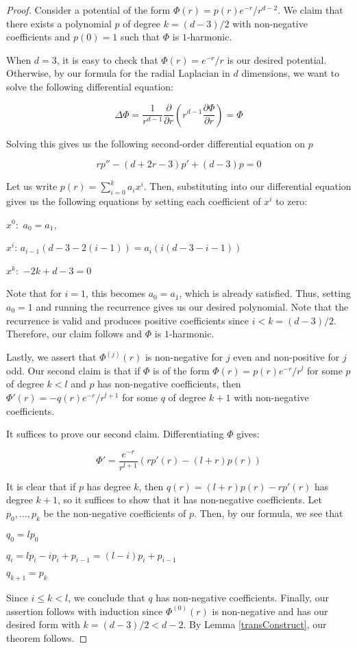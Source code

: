 \begin{proof}
Consider a potential of the form $\Phi(r) = p(r)e^{-r}/r^{d-2}$. We claim that there exists a polynomial $p$ of degree $k = (d-3)/2$ with non-negative coefficients and $p(0) = 1$ such that $\Phi$ is $1$-harmonic.

When $d = 3$, it is easy to check that $\Phi(r) = e^{-r}/r$ is our desired potential. Otherwise, by our formula for the radial Laplacian in $d$ dimensions, we want to solve the following differential equation:

\[\Delta \Phi =  \frac{1}{r^{d-1}} \frac{\partial}{\partial r} (r^{d-1} \frac{\partial \Phi}{\partial r}) = \Phi\]

Solving this gives us the following second-order differential equation on $p$

\[rp'' - (d+2r-3)p' +(d-3)p = 0\]

Let us write $p(r) = \sum_{i=0}^k a_i x^i$. Then, substituting into our differential equation gives us the following equations by setting each coefficient of $x^i$ to zero:

$x^0:$ $a_0 = a_1$,

$x^i$:  $a_{i-1}(d-3 - 2(i-1)) = a_i (i(d-3 - i-1))$

$x^k:$ $-2k +d-3 = 0$

Note that for $i = 1$, this becomes $a_0 = a_1$, which is already satisfied. Thus, setting $a_0 = 1$ and running the recurrence gives us our desired polynomial. Note that the recurrence is valid and produces positive coefficients since $i < k  = (d-3)/2$. Therefore, our claim follows and $\Phi$ is $1$-harmonic.

Lastly, we assert that $\Phi^{(j)}(r)$ is non-negative for $j$ even and non-positive for $j$ odd. Our second claim is that if $\Phi$ is of the form $\Phi(r) = p(r) e^{-r}/r^{l}$ for some $p$ of degree $k < l$ and $p$ has non-negative coefficients, then $\Phi'(r) = - q(r) e^{-r}/r^{l+1}$ for some $q$ of degree $k+1$ with non-negative coefficients. 

It suffices to prove our second claim. Differentiating $\Phi$ gives:

\[\Phi' = \frac{e^{-r}}{r^{l+1}} (rp'(r) - (l + r)p(r))\]

It is clear that if $p$ has degree $k$, then $q(r) = (l+r)p(r) - rp'(r)$ has degree $k+1$, so it suffices to show that it has non-negative coefficients. Let $p_0,..., p_k$ be the non-negative coefficients of $p$. Then, by our formula, we see that 

$q_0 = l p_0$

$q_i = lp_i - ip_i + p_{i-1} = (l-i)p_i + p_{i-1}$ 

$q_{k+1} = p_k$

Since $i \leq k < l$, we conclude that $q$ has non-negative coefficients. Finally, our assertion follows with induction since $\Phi^{(0)}(r)$ is non-negative and has our desired form with $k = (d-3)/2 < d-2$. By Lemma \ref{transConstruct}, our theorem follows.
\end{proof}